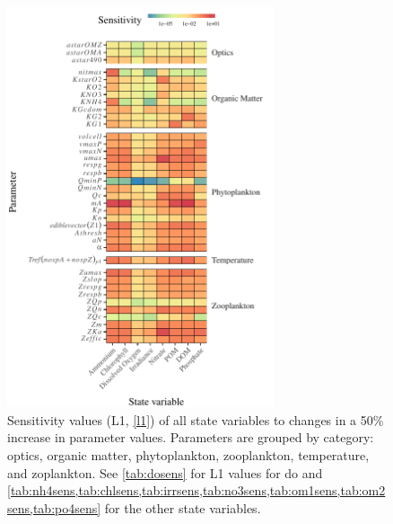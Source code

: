 \documentclass[review]{elsarticle}\usepackage[]{graphicx}\usepackage[]{color}
\begin{document}
\begin{figure}[!ht]

{\centering \includegraphics[width=0.7\textwidth]{figs/sensalltile-1} 

}

\caption{Sensitivity values (L1, \cref{l1}) of all state variables to changes in a 50\% increase in parameter values. Parameters are grouped by category: optics, organic matter, phytoplankton, zooplankton, temperature, and zoplankton.  See \cref{tab:dosens} for L1 values for \ac{do} and \cref{tab:nh4sens,tab:chlsens,tab:irrsens,tab:no3sens,tab:om1sens,tab:om2sens,tab:po4sens} for the other state variables.}\label{fig:sensalltile}
\end{figure}
\end{document}
